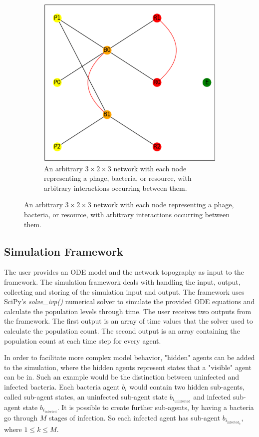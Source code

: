 \begin{figure}
\begin{subfigure}{0.49\linewidth}
        \includegraphics[width=\linewidth]{Screenshots/example_network.png}
        \caption{
            An arbitrary $3\times2\times3$ network with each node representing a phage, bacteria, or resource, with arbitrary interactions occurring between them. 
        }
        \label{fig:ss:example_network}
    \end{subfigure} 
 \end{figure}

\subsection{Simulation Framework}
\label{sec:simulation_framework}
The user provides an ODE model and the network topography as input to the framework. 
The simulation framework deals with handling the input, output, collecting and storing of the simulation input and output.
The framework uses SciPy's \cite{virtanenSciPy10Fundamental2020} \textit{solve\_ivp()} numerical solver \cite{ dormandFamilyEmbeddedRungeKutta1980} to simulate the provided ODE equations and calculate the population levels through time.
The user receives two outputs from the framework. 
The first output is an array of time values that the solver used to calculate the population count.
The second output is an array containing the population count at each time step for every agent.

In order to facilitate more complex model behavior, "hidden" agents can be added to the simulation, where the hidden agents represent states that a "visible" agent can be in. 
Such an example would be the distinction between uninfected and infected bacteria. 
Each bacteria agent $b_i$ would contain two hidden sub-agents, called sub-agent states, an uninfected sub-agent state $b_{i_\text{uninfected}}$ and infected sub-agent state $b_{i_\text{infected}}$. 
It is possible to create further sub-agents, by having a bacteria go through $M$ stages of infection. 
So each infected agent has sub-agent $b_{i_{\text{infected}_k}}$, where $1 \leq k \leq M$. 


